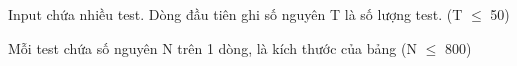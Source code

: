 Input chứa nhiều test. Dòng đầu tiên ghi số nguyên T là số lượng test. (T $\le$ 50)

Mỗi test chứa số nguyên N trên 1 dòng, là kích thước của bảng (N $\le$ 800)